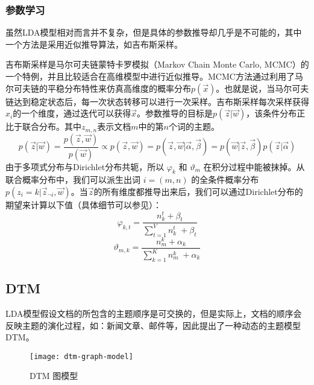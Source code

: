 \subsubsection{参数学习}
虽然LDA模型相对而言并不复杂，但是具体的参数推导却几乎是不可能的，其中一个方法是采用近似推导算法，如吉布斯采样\cite{griffiths2004finding}。\par
吉布斯采样是马尔可夫链蒙特卡罗模拟（Markov Chain Monte Carlo, MCMC）\cite{mackay2003information}的一个特例，并且比较适合在高维模型中进行近似推导。MCMC方法通过利用了马尔可夫链的平稳分布特性来仿真高维度的概率分布$p(\vec{x})$。也就是说，当马尔可夫链达到稳定状态后，每一次状态转移可以进行一次采样\cite{Walsh:2004}。吉布斯采样每次采样获得$x_i$的一个维度，通过迭代可以获得$\vec{x}$。参数推导的目标是$p(\vec{z}|\vec{w})$，该条件分布正比于联合分布。其中$z_{m,n}$表示文档$m$中的第$n$个词的主题。
\begin{equation}
p(\vec{z}|\vec{w})=\frac{p(\vec{z}, \vec{w})}{p(\vec{w})} \propto p(\vec{z}, \vec{w}) = p(\vec{z}, \vec{w}|\vec{\alpha},\vec{\beta}) = p(\vec{w}|\vec{z},\vec{\beta})p(\vec{z}|\vec{\alpha})
\end{equation}
由于多项式分布与Dirichlet分布共轭，所以 $\varphi_k$ 和 $\vartheta_m$ 在积分过程中能被抹掉。从联合概率分布中，我们可以派生出词 $i=(m,n)$ 的全条件概率分布$p(z_i=k|\vec{z}_{\neg i},\vec{w})$。当$\vec{z}$的所有维度都推导出来后，我们可以通过Dirichlet分布的期望来计算以下值（具体细节可以参见\cite{heinrich2005parameter}）：
\begin{equation}
\varphi_{k,t}=\frac{n_{k}^{t}+\beta_{t}}{\sum_{t=1}^{V}n_{k}^{t} \; +\beta_{t}}
\end{equation} 
\begin{equation}
\vartheta_{m,k}=\frac{n_{m}^{k}+\alpha_k}{\sum_{k=1}^{K}n_{m}^{k} \; +\alpha_k}
\end{equation} 

\subsection{DTM}
\label{intro-dtm}
LDA模型假设文档的所包含的主题顺序是可交换的，但是实际上，文档的顺序会反映主题的演化过程，如：新闻文章、邮件等，因此\cite{Blei:2006}提出了一种动态的主题模型DTM。
\begin{figure}[!htb]
	\centering
		\texttt{[image: dtm-graph-model]}
	\caption{DTM 图模型}
	\label{fig:dtm-graph-model}
\end{figure}


